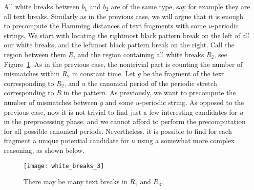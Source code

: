 \documentclass[runningheads]{llncs}
\begin{document}
\begin{mycases}[listparindent=15pt]
\item All white breaks between $b_1$ and $b_2$ are of the same type, say for example they are all text breaks. Similarly as in the previous case, we will argue that it is enough to precompute the Hamming distances of text fragments with some $u$-periodic strings. We start with locating the rightmost black pattern break on the left of all our white breaks, and the leftmost black pattern break on the right. Call the region between them $R$, and the region containing all white breaks $R_2$, see Figure~\ref{figure:white_breaks_3}. As in the previous case, the nontrivial part is counting the number of mismatches within $R_{2}$ in constant time. Let $g$ be the fragment of the text corresponding to $R_2$, and $u$ the canonical period of the periodic stretch corresponding to $R$ in the pattern. As previously, we want to precompute the number of mismatches between $g$ and some $u$-periodic string. As opposed to the previous case, now it is not trivial to find just a few interesting candidates for $u$ in the preprocessing phase, and we cannot afford to perform the precomputation for all possible canonical periods. Nevertheless, it is possible to find for each fragment a unique potential candidate for $u$ using a somewhat more complex reasoning, as shown below.

\begin{figure}[t]
\texttt{[image: white\_breaks\_3]}
\caption{There may be many text breaks in $R_1$ and $R_3$.}
\label{figure:white_breaks_3}
\end{figure}


\end{mycases}
\end{document}
